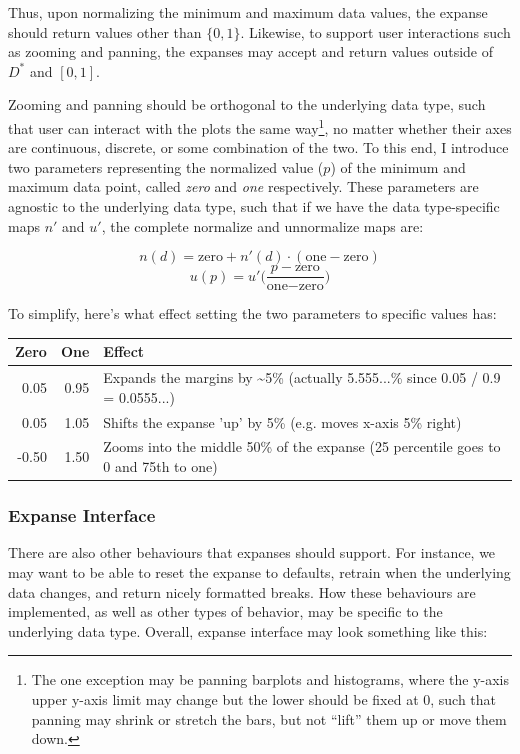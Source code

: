 \documentclass[
]{book}
\theoremstyle{definition}
\theoremstyle{definition}
\theoremstyle{definition}
\theoremstyle{definition}
\theoremstyle{remark}
\begin{document}
Thus, upon normalizing the minimum and maximum data values, the expanse should return values other than \(\{0, 1\}\). Likewise, to support user interactions such as zooming and panning, the expanses may accept and return values outside of \(D^*\) and \([0, 1]\).

Zooming and panning should be orthogonal to the underlying data type, such that user can interact with the plots the same way\footnote{The one exception may be panning barplots and histograms, where the y-axis upper y-axis limit may change but the lower should be fixed at 0, such that panning may shrink or stretch the bars, but not ``lift'' them up or move them down.}, no matter whether their axes are continuous, discrete, or some combination of the two. To this end, I introduce two parameters representing the normalized value (\(p\)) of the minimum and maximum data point, called \emph{zero} and \emph{one} respectively. These parameters are agnostic to the underlying data type, such that if we have the data type-specific maps \(n'\) and \(u'\), the complete normalize and unnormalize maps are:

\[n(d) = \text{zero} + n'(d) \cdot (\text{one} - \text{zero})\]
\[u(p) = u' \bigg(\frac{p - \text{zero}}{\text{one} - \text{zero}} \bigg)\]

To simplify, here's what effect setting the two parameters to specific values has:

\begin{tabular}{r|r|l}
\hline
Zero & One & Effect\\
\hline
0.05 & 0.95 & Expands the margins by \textasciitilde{}5\% (actually 5.555...\% since 0.05 / 0.9 = 0.0555...)\\
\hline
0.05 & 1.05 & Shifts the expanse 'up' by 5\% (e.g. moves x-axis 5\% right)\\
\hline
-0.50 & 1.50 & Zooms into the middle 50\% of the expanse (25 percentile goes to 0 and 75th to one)\\
\hline
\end{tabular}

\subsubsection{Expanse Interface}\label{expanse-interface}

There are also other behaviours that expanses should support. For instance, we may want to be able to reset the expanse to defaults, retrain when the underlying data changes, and return nicely formatted breaks. How these behaviours are implemented, as well as other types of behavior, may be specific to the underlying data type. Overall, expanse interface may look something like this:
\end{document}
